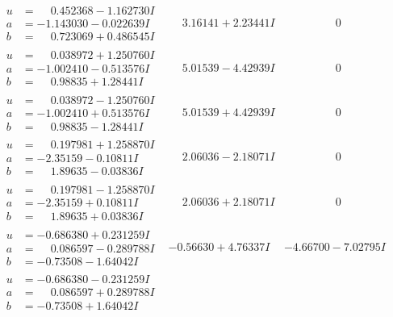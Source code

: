 \documentclass[1p]{elsarticle_modified}
\theoremstyle{definition}
\begin{document}
$$\begin{array}{c|c|c}
\begin{aligned}
u &= \phantom{-}0.452368 - 1.162730 I \\
a &= -1.143030 - 0.022639 I \\
b &= \phantom{-}0.723069 + 0.486545 I\end{aligned}
 & \phantom{-}3.16141 + 2.23441 I & \phantom{-0.000000 } 0 \\ \hline\begin{aligned}
u &= \phantom{-}0.038972 + 1.250760 I \\
a &= -1.002410 - 0.513576 I \\
b &= \phantom{-}0.98835 + 1.28441 I\end{aligned}
 & \phantom{-}5.01539 - 4.42939 I & \phantom{-0.000000 } 0 \\ \hline\begin{aligned}
u &= \phantom{-}0.038972 - 1.250760 I \\
a &= -1.002410 + 0.513576 I \\
b &= \phantom{-}0.98835 - 1.28441 I\end{aligned}
 & \phantom{-}5.01539 + 4.42939 I & \phantom{-0.000000 } 0 \\ \hline\begin{aligned}
u &= \phantom{-}0.197981 + 1.258870 I \\
a &= -2.35159 - 0.10811 I \\
b &= \phantom{-}1.89635 - 0.03836 I\end{aligned}
 & \phantom{-}2.06036 - 2.18071 I & \phantom{-0.000000 } 0 \\ \hline\begin{aligned}
u &= \phantom{-}0.197981 - 1.258870 I \\
a &= -2.35159 + 0.10811 I \\
b &= \phantom{-}1.89635 + 0.03836 I\end{aligned}
 & \phantom{-}2.06036 + 2.18071 I & \phantom{-0.000000 } 0 \\ \hline\begin{aligned}
u &= -0.686380 + 0.231259 I \\
a &= \phantom{-}0.086597 - 0.289788 I \\
b &= -0.73508 - 1.64042 I\end{aligned}
 & -0.56630 + 4.76337 I & -4.66700 - 7.02795 I \\ \hline\begin{aligned}
u &= -0.686380 - 0.231259 I \\
a &= \phantom{-}0.086597 + 0.289788 I \\
b &= -0.73508 + 1.64042 I\end{aligned}

\end{array}$$
\end{document}
